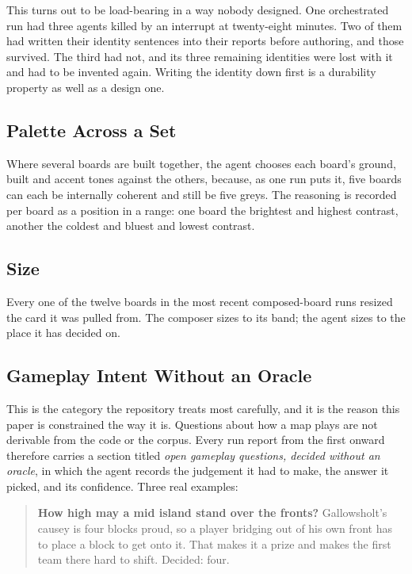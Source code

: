 This turns out to be load-bearing in a way nobody designed. One orchestrated run
had three agents killed by an interrupt at twenty-eight minutes. Two of them had
written their identity sentences into their reports before authoring, and those
survived. The third had not, and its three remaining identities were lost with it
and had to be invented again. Writing the identity down first is a durability
property as well as a design one.

\subsection{Palette Across a Set}

Where several boards are built together, the agent chooses each board's ground,
built and accent tones against the others, because, as one run puts it, five boards
can each be internally coherent and still be five greys. The reasoning is
recorded per board as a position in a range: one board the brightest and highest
contrast, another the coldest and bluest and lowest contrast.

\subsection{Size}

Every one of the twelve boards in the most recent composed-board runs resized the
card it was pulled from. The composer sizes to its band; the agent sizes to the
place it has decided on.

\subsection{Gameplay Intent Without an Oracle}

This is the category the repository treats most carefully, and it is the reason
this paper is constrained the way it is. Questions about how a map plays are not
derivable from the code or the corpus. Every run report from the first onward
therefore carries a section titled \emph{open gameplay questions, decided without
an oracle}, in which the agent records the judgement it had to make, the answer it
picked, and its confidence. Three real examples:

\begin{quote}
\textbf{How high may a mid island stand over the fronts?} Gallowsholt's causey is
four blocks proud, so a player bridging out of his own front has to place a block
to get onto it. That makes it a prize and makes the first team there hard to
shift. Decided: four.
\end{quote}

